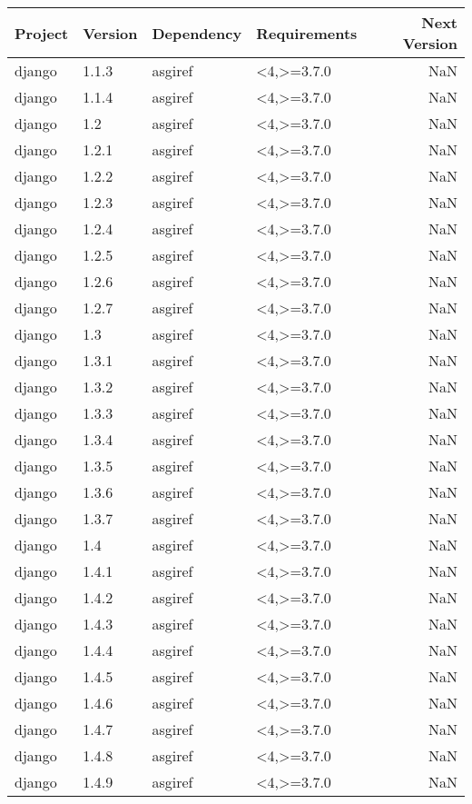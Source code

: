 \begin{tabular}{llllr}
\toprule
Project & Version & Dependency & Requirements & Next Version \\
\midrule
django & 1.1.3 & asgiref & <4,>=3.7.0 & NaN \\
django & 1.1.4 & asgiref & <4,>=3.7.0 & NaN \\
django & 1.2 & asgiref & <4,>=3.7.0 & NaN \\
django & 1.2.1 & asgiref & <4,>=3.7.0 & NaN \\
django & 1.2.2 & asgiref & <4,>=3.7.0 & NaN \\
django & 1.2.3 & asgiref & <4,>=3.7.0 & NaN \\
django & 1.2.4 & asgiref & <4,>=3.7.0 & NaN \\
django & 1.2.5 & asgiref & <4,>=3.7.0 & NaN \\
django & 1.2.6 & asgiref & <4,>=3.7.0 & NaN \\
django & 1.2.7 & asgiref & <4,>=3.7.0 & NaN \\
django & 1.3 & asgiref & <4,>=3.7.0 & NaN \\
django & 1.3.1 & asgiref & <4,>=3.7.0 & NaN \\
django & 1.3.2 & asgiref & <4,>=3.7.0 & NaN \\
django & 1.3.3 & asgiref & <4,>=3.7.0 & NaN \\
django & 1.3.4 & asgiref & <4,>=3.7.0 & NaN \\
django & 1.3.5 & asgiref & <4,>=3.7.0 & NaN \\
django & 1.3.6 & asgiref & <4,>=3.7.0 & NaN \\
django & 1.3.7 & asgiref & <4,>=3.7.0 & NaN \\
django & 1.4 & asgiref & <4,>=3.7.0 & NaN \\
django & 1.4.1 & asgiref & <4,>=3.7.0 & NaN \\
django & 1.4.2 & asgiref & <4,>=3.7.0 & NaN \\
django & 1.4.3 & asgiref & <4,>=3.7.0 & NaN \\
django & 1.4.4 & asgiref & <4,>=3.7.0 & NaN \\
django & 1.4.5 & asgiref & <4,>=3.7.0 & NaN \\
django & 1.4.6 & asgiref & <4,>=3.7.0 & NaN \\
django & 1.4.7 & asgiref & <4,>=3.7.0 & NaN \\
django & 1.4.8 & asgiref & <4,>=3.7.0 & NaN \\
django & 1.4.9 & asgiref & <4,>=3.7.0 & NaN \\

\end{tabular}
